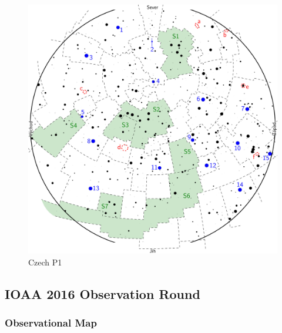 \documentclass[a4paper,12pt]{extarticle}
\begin{document}
\begin{figure}[H]
	\centering
	\includegraphics[width=0.9\linewidth]{Cz1.png}
	\caption{Czech P1}
	\label{cz1}
\end{figure}


\subsection{IOAA 2016 Observation Round}

\subsubsection{Observational Map}
\end{document}
